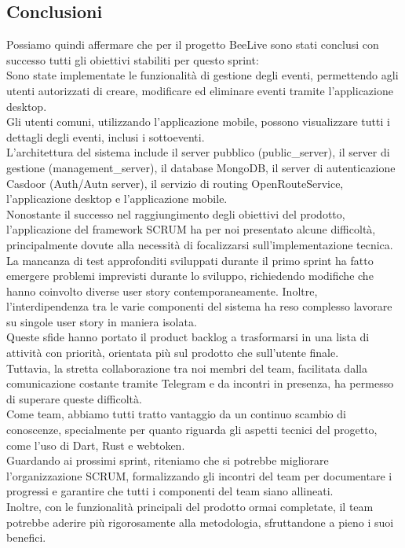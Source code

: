 \documentclass{article}
\begin{document}
\subsection{Conclusioni}

Possiamo quindi affermare che per il progetto BeeLive sono stati conclusi con successo tutti gli obiettivi stabiliti per questo sprint:\\
Sono state implementate le funzionalità di gestione degli eventi, permettendo agli utenti autorizzati di creare, modificare ed eliminare eventi tramite l'applicazione desktop.\\
Gli utenti comuni, utilizzando l'applicazione mobile, possono visualizzare tutti i dettagli degli eventi, inclusi i sottoeventi.\\
L'architettura del sistema include il server pubblico (public\_server), il server di gestione (management\_server), il database MongoDB, il server di autenticazione Casdoor (Auth/Autn server), il servizio di routing OpenRouteService, l'applicazione desktop e l'applicazione mobile.\\

\noindent Nonostante il successo nel raggiungimento degli obiettivi del prodotto, l'applicazione del framework SCRUM ha per noi presentato alcune difficoltà, principalmente dovute alla necessità di focalizzarsi sull'implementazione tecnica.\\
La mancanza di test approfonditi sviluppati durante il primo sprint ha fatto emergere problemi imprevisti durante lo sviluppo, richiedendo modifiche che hanno coinvolto diverse user story contemporaneamente. Inoltre, l'interdipendenza tra le varie componenti del sistema ha reso complesso lavorare su singole user story in maniera isolata.\\
Queste sfide hanno portato il product backlog a trasformarsi in una lista di attività con priorità, orientata più sul prodotto che sull'utente finale.\\

\noindent Tuttavia, la stretta collaborazione tra noi membri del team, facilitata dalla comunicazione costante tramite Telegram e da incontri in presenza, ha permesso di superare queste difficoltà.\\
Come team, abbiamo tutti tratto vantaggio da un continuo scambio di conoscenze, specialmente per quanto riguarda gli aspetti tecnici del progetto, come l'uso di Dart, Rust e webtoken.\\

\noindent Guardando ai prossimi sprint, riteniamo che si potrebbe migliorare l'organizzazione SCRUM, formalizzando gli incontri del team per documentare i progressi e garantire che tutti i componenti del team siano allineati.\\
Inoltre, con le funzionalità principali del prodotto ormai completate, il team potrebbe aderire più rigorosamente alla metodologia, sfruttandone a pieno i suoi benefici.\\
\end{document}
